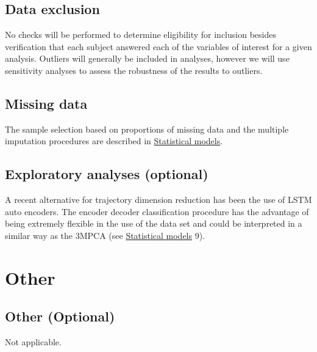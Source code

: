 \documentclass[]{article}
\begin{document}
\hypertarget{data-exclusion}{%
\subsection{Data exclusion}\label{data-exclusion}}

No checks will be performed to determine eligibility for inclusion
besides verification that each subject answered each of the variables of
interest for a given analysis. Outliers will generally be included in
analyses, however we will use sensitivity analyses to assess the
robustness of the results to outliers.

\hypertarget{missing-data}{%
\subsection{Missing data}\label{missing-data}}

The sample selection based on proportions of missing data and the
multiple imputation procedures are described in
\protect\hyperlink{statistical-models}{Statistical models}.

\hypertarget{exploratory-analyses-optional}{%
\subsection{Exploratory analyses
(optional)}\label{exploratory-analyses-optional}}

A recent alternative for trajectory dimension reduction has been the use
of LSTM auto encoders. The encoder decoder classification procedure has
the advantage of being extremely flexible in the use of the data set and
could be interpreted in a similar way as the 3MPCA (see
\protect\hyperlink{statistical-models}{Statistical models} 9).

\hypertarget{other}{%
\section{Other}\label{other}}

\hypertarget{other-optional}{%
\subsection{Other (Optional)}\label{other-optional}}

Not applicable.

\hypertarget{section}{%
\subsection{}\label{section}}

\vspace{-2pc}
\setlength{\parindent}{-0.5in}
\setlength{\leftskip}{-1in}
\setlength{\parskip}{8pt}

\noindent


\end{document}
